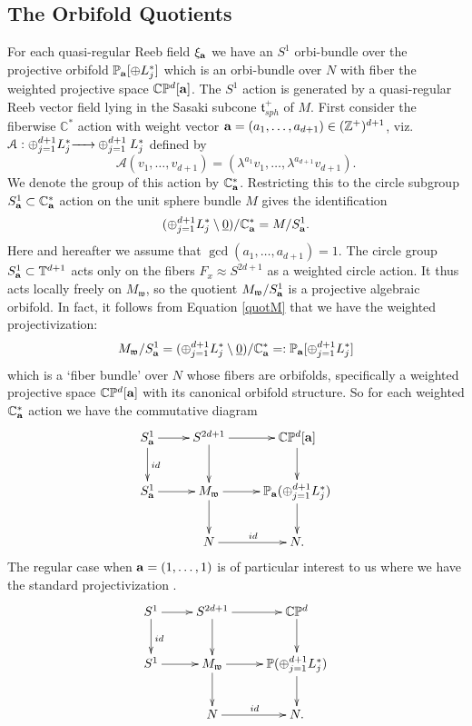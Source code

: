 \documentclass[12pt]{amsart}
\def\bbc{{\mathbb C}}
\def\bbp{{\mathbb P}}
\def\bbt{{\mathbb T}}
\def\bbz{{\mathbb Z}}
\def\grl{\lambda}
\def\bfa{{\bf a}}
\def\cala{{\mathcal A}}
\def\ra#1{\hbox to #1pc{\rightarrowfill}}
\def\gt{{\mathfrak t}}
\def\gw{{\mathfrak w}}
\begin{document}
\subsection{The Orbifold Quotients}\label{orbquot}
For each quasi-regular Reeb field $\xi_\bfa$ we have an $S^1$ orbi-bundle over the projective orbifold $\bbp_\bfa[\oplus L^*_j]$ which is an orbi-bundle over $N$ with fiber the weighted projective space $\bbc\bbp^d[\bfa]$. 
The $S^1$ action is generated by a quasi-regular Reeb vector field lying in the Sasaki subcone $\gt^+_{sph}$ of $M$. First consider the fiberwise $\bbc^*$ action with weight vector $\bfa=(a_1,\ldots,a_{d+1})\in (\bbz^+)^{d+1}$, viz. $\cala: \oplus_{j=1}^{d+1}L^*_j\ra{1.6} \oplus_{j=1}^{d+1}L^*_j$ defined by
\begin{equation}\label{C*act}
\cala(v_1,\ldots,v_{d+1})=(\grl^{a_1}v_1,\ldots,\grl^{a_{d+1}}v_{d+1}).
\end{equation}
We denote the group of this action by $\bbc^*_\bfa$. Restricting this to the circle subgroup $S^1_\bfa\subset \bbc^*_\bfa$ action on the unit sphere bundle $M$ gives the identification 
\begin{equation}\label{quotM}
(\oplus_{j=1}^{d+1}L^*_j\setminus\underline{0})/\bbc^*_\bfa=M/S^1_\bfa.
\end{equation}
Here and hereafter we assume that $\gcd(a_1,\ldots,a_{d+1})=1$.
The circle group $S^1_\bfa\subset\bbt^{d+1}$ acts only on the fibers $F_x\approx S^{2d+1}$ as a weighted circle action. It thus acts locally freely on $M_\gw$, so the quotient $M_\gw/S^1_\bfa$ is a projective algebraic orbifold. In fact, it follows from Equation \eqref{quotM} that we have the weighted projectivization:
$$M_\gw/S^1_\bfa = (\oplus_{j=1}^{d+1}L^*_j\setminus\underline{0})/\bbc^*_\bfa =: \bbp_\bfa[\oplus_{j=1}^{d+1}L^*_j]$$
which is a `fiber bundle' over $N$ whose fibers are orbifolds, specifically a weighted projective space $\bbc\bbp^d[\bfa]$ with its canonical orbifold structure. So for each weighted $\bbc^*_\bfa$ action we have the commutative diagram
\begin{equation}\label{bundiag}
\xymatrix{
S^1_\bfa \ar[d]^{id} \ar[r]  &S^{2d+1}\ar[d] \ar[r] &\bbc\bbp^d[\bfa] \ar[d]  \\
               S^1_\bfa \ar[r]&M_\gw \ar[r] \ar[d] &\bbp_\bfa(\oplus_{j=1}^{d+1}L^*_j)\ar[d]  \\
&N  \ar[r]^{id}  &N.}
\end{equation}
The regular case when $\bfa=(1,\ldots,1)$ is of particular interest to us where we have the standard projectivization \cite{BoTu82}. 
\begin{equation}\label{bundiagreg}
\xymatrix{
S^1\ar[d]^{id} \ar[r]  &S^{2d+1}\ar[d] \ar[r] &\bbc\bbp^d \ar[d]  \\
               S^1 \ar[r]&M_\gw \ar[r] \ar[d] &\bbp(\oplus_{j=1}^{d+1}L^*_j)\ar[d]  \\
&N \ar[r]^{id}  &N.}
\end{equation}
\end{document}
